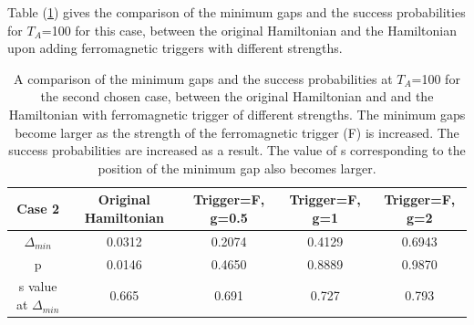 \documentclass[12]{article}
\begin{document}
Table (\ref{tab:f2}) gives the comparison of the minimum gaps and the success probabilities for $T_A$=100 for this case, between the original Hamiltonian and the Hamiltonian upon adding ferromagnetic triggers with different strengths.
\begin{table}
\centering
\renewcommand{\arraystretch}{1.8}
\begin{tabular}{|c|c|c|c|c|}
\hline 
Case 2 & Original Hamiltonian & Trigger=F, g=0.5 & Trigger=F, g=1 & Trigger=F, g=2 \\ 
\hline 
$\Delta_{min}$ & 0.0312 & 0.2074 & 0.4129 & 0.6943 \\ 
\hline 
p & 0.0146 & 0.4650 & 0.8889 & 0.9870 \\ 
\hline 
s value at $\Delta_{min}$ & 0.665 & 0.691 & 0.727 & 0.793 \\
\hline

\end{tabular} 
\caption{A comparison of the minimum gaps and the success probabilities at $T_A$=100 for the second chosen case, between the original Hamiltonian and and the Hamiltonian with ferromagnetic trigger of different strengths. The minimum gaps become larger as the strength of the ferromagnetic trigger (F) is increased. The success probabilities are increased as a result. The value of s corresponding to the position of the minimum gap also becomes larger.}
\label{tab:f2}
\end{table}
\end{document}
